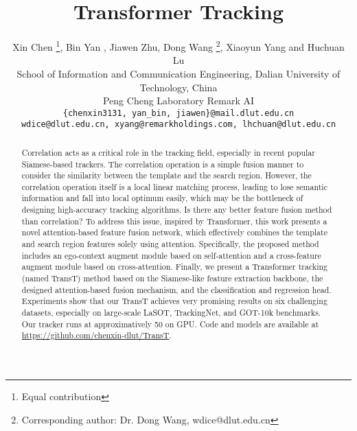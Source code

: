 \documentclass[final]{cvpr}
\begin{document}
\title{Transformer Tracking}


\author{Xin Chen \thanks{Equal contribution}, Bin Yan  \footnotemark[1], Jiawen Zhu, Dong Wang \thanks{Corresponding author: Dr. Dong Wang, wdice@dlut.edu.cn}, Xiaoyun Yang and Huchuan Lu\\
School of Information and Communication Engineering, Dalian University of Technology, China\\
Peng Cheng Laboratory Remark AI\\


{\tt\small \{chenxin3131, yan\_bin, jiawen\}@mail.dlut.edu.cn}\\ {\tt\small wdice@dlut.edu.cn, xyang@remarkholdings.com, lhchuan@dlut.edu.cn}
}

\maketitle


\begin{abstract}
Correlation acts as a critical role in the tracking field, especially in recent popular Siamese-based trackers. 
The correlation operation is a simple fusion manner to consider the similarity between the template and the search region. 
However, the correlation operation itself is a local linear matching process, leading to lose semantic information and fall into local optimum easily, which may be the bottleneck of designing high-accuracy tracking algorithms. 
Is there any better feature fusion method than correlation? 
To address this issue, inspired by Transformer, this work presents a novel attention-based feature fusion network, 
   which effectively combines the template and search region features solely using attention. 
Specifically, the proposed method includes an ego-context augment module based on self-attention and a cross-feature 
   augment module based on cross-attention. 
Finally, we present a Transformer tracking (named TransT) method based on the Siamese-like feature 
   extraction backbone, the designed attention-based fusion mechanism, and the classification and regression head. 
Experiments show that our TransT achieves very promising results on six challenging datasets, 
   especially on large-scale LaSOT, TrackingNet, and GOT-10k benchmarks. 
Our tracker runs at approximatively 50  on GPU. Code and models are available at \href{https://github.com/chenxin-dlut/TransT}{https://github.com/chenxin-dlut/TransT}.
\end{abstract}

\thispagestyle{empty}
\end{document}
